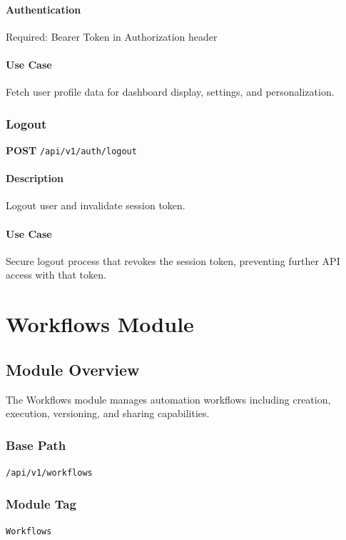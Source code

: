 \documentclass[11pt,a4paper]{report}
\begin{document}
\subsubsection{Authentication}
Required: Bearer Token in Authorization header

\subsubsection{Use Case}
Fetch user profile data for dashboard display, settings, and personalization.

\subsection{Logout}

\textbf{POST} \texttt{/api/v1/auth/logout}

\subsubsection{Description}
Logout user and invalidate session token.

\subsubsection{Use Case}
Secure logout process that revokes the session token, preventing further API access with that token.

\newpage

\chapter{Workflows Module}

\section{Module Overview}

The Workflows module manages automation workflows including creation, execution, versioning, and sharing capabilities.

\subsection{Base Path}
\texttt{/api/v1/workflows}

\subsection{Module Tag}
\texttt{Workflows}
\end{document}
